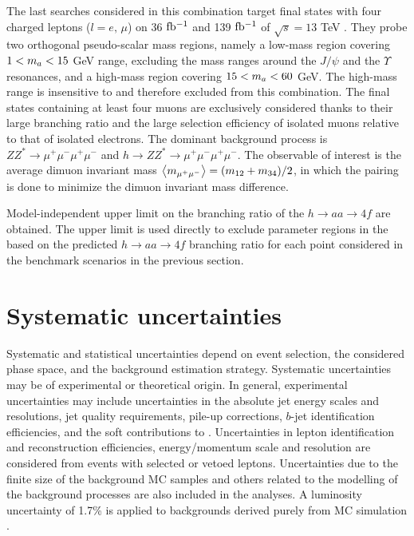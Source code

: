 The last searches considered in this combination target final states with four charged leptons ($l=e,\,\mu$) on 36 $\mbox{fb\(^{-1}\)}$ and 139 $\mbox{fb\(^{-1}\)}$ of $\sqrt{s}=13$ TeV \cite{EXOT-2016-22, HDBS-2018-55}. They probe two orthogonal pseudo-scalar mass regions, namely a low-mass region covering $1<m_a<15$ GeV range, excluding the mass ranges around the $J/\psi$ and the $\Upsilon$ resonances, and a high-mass region covering $15<m_a<60$ GeV. The high-mass range is insensitive to \thdma and therefore excluded from this combination. The final states containing at least four muons are exclusively considered thanks to their large branching ratio and the large selection efficiency of isolated muons relative to that of isolated electrons. The dominant background process is $ZZ^*\rightarrow \mu^+\mu^-\mu^+\mu^-$ and $h\rightarrow ZZ^*\rightarrow \mu^+\mu^-\mu^+\mu^-$. The observable of interest is the average dimuon invariant mass $\expval{m_{\mu^+\mu^-}} = (m_{12} + m_{34})/2$, in which the pairing is done to minimize the dimuon invariant mass difference. 

Model-independent upper limit on the branching ratio of the $h\rightarrow aa \rightarrow 4f$ are obtained. The upper limit is used directly to exclude parameter regions in the \thdma based on the predicted $h\rightarrow aa \rightarrow 4f$ branching ratio for each point considered in the benchmark scenarios in the previous section. 


\section{Systematic uncertainties}
\label{sect:systematic-uncertainties}

Systematic and statistical uncertainties depend on event selection, the considered phase space, and the background estimation strategy. Systematic uncertainties may be of experimental or theoretical origin. In general, experimental uncertainties may include uncertainties in the absolute jet energy scales and resolutions, jet quality requirements, pile-up corrections, $b$-jet identification efficiencies, and the soft contributions to \met. Uncertainties in lepton identification and reconstruction efficiencies, energy/momentum scale and resolution are considered from events with selected or vetoed leptons. Uncertainties due to the finite size of the background MC samples and others related to the modelling of the background processes are also included in the analyses. A luminosity uncertainty of 1.7\% is applied to backgrounds derived purely from MC simulation \cite{ATLAS-CONF-2019-021}. 


